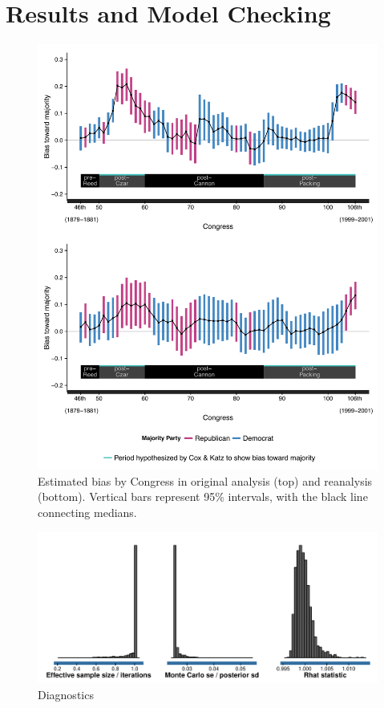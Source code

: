 \section{Results and Model Checking}


\begin{figure}
\centering
\includegraphics[scale=0.75]{sections/figs/ck_replication}
\caption{Estimated bias by Congress in original analysis (top) and reanalysis (bottom). Vertical bars represent 95\%  intervals, with the black line connecting medians.}
\label{fig:ck_bias}
\end{figure}


\begin{figure}
\centering
	\includegraphics[scale=0.67]{sections/figs/ck_diagnostics}
\caption{Diagnostics}
\label{fig:ck_diagnostics}
\end{figure}



